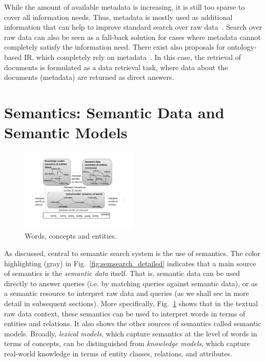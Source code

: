 While the amount of available metadata is increasing, it is still too sparse to cover all information needs. Thus, metadata is mostly used as additional information that can help to improve standard search over raw data~\cite{DBLP:journals/tkde/CastellsFV07,DBLP:journals/ws/FernandezCLVCM11}. Search over raw data can also be seen as a fall-back solution for cases where metadata cannot completely satisfy the information need. There exist also 	proposals for ontology-based IR, which completely rely on metadata~\cite{tran2007expressive}. In this case, the retrieval of documents is formulated as a data retrieval task, where data about the documents (metadata) are returned as direct answers. 

\section{Semantics: Semantic Data and Semantic Models}\label{sec:semantics}
\begin{figure}[thb]
	\centering
		\includegraphics[width=0.5\textwidth]{figs/semantic_layer.pdf}
	\caption{Words, concepts and entities.}
	\label{fig:semantic_layer}
\end{figure}

As discussed, central to semantic search system is the use of semantics. The color highlighting (gray) in Fig.~\ref{fig:semsearch_detailed} indicates that a main source of semantics is the \emph{semantic data} itself. That is, semantic data can be used directly to answer queries (i.e. by matching queries against semantic data), or as a semantic resource to interpret raw data and queries (as we shall see in more detail in subsequent sections). More specifically, Fig.~\ref{fig:semantic_layer} shows that in the textual raw data context, these semantics can be used to interpret words in terms of entities and relations. It also shows the other sources of semantics called semantic models. Broadly, \emph{lexical models}, which capture semantics at the level of words in terms of concepts, can be distinguished from \emph{knowledge models}, which capture real-world knowledge in terms of entity classes, relations, and attributes. 

